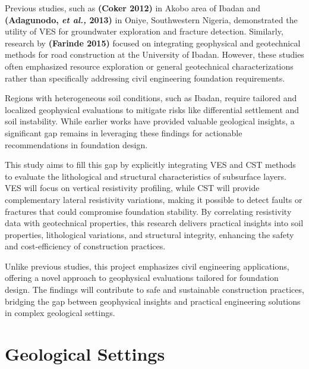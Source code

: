 \documentclass[12pt,a4paper]{report}
\begin{document}
Previous studies, such as \textbf{(Coker 2012)} in Akobo area of Ibadan and \textbf{(Adagunodo, \textit{et al.,} 2013)} in Oniye, Southwestern Nigeria, demonstrated the utility of VES for groundwater exploration and fracture detection. Similarly, research by \textbf{(Farinde 2015)} focused on integrating geophysical and geotechnical methods for road construction at the University of Ibadan. However, these studies often emphasized resource exploration or general geotechnical characterizations rather than specifically addressing civil engineering foundation requirements.

Regions with heterogeneous soil conditions, such as Ibadan, require tailored and localized geophysical evaluations to mitigate risks like differential settlement and soil instability. While earlier works have provided valuable geological insights, a significant gap remains in leveraging these findings for actionable recommendations in foundation design.

This study aims to fill this gap by explicitly integrating VES and CST methods to evaluate the lithological and structural characteristics of subsurface layers. VES will focus on vertical resistivity profiling, while CST will provide complementary lateral resistivity variations, making it possible to detect faults or fractures that could compromise foundation stability. By correlating resistivity data with geotechnical properties, this research delivers practical insights into soil properties, lithological variations, and structural integrity, enhancing the safety and cost-efficiency of construction practices.

Unlike previous studies, this project emphasizes civil engineering applications, offering a novel approach to geophysical evaluations tailored for foundation design. The findings will contribute to safe and sustainable construction practices, bridging the gap between geophysical insights and practical engineering solutions in complex geological settings.

\section{Geological Settings}
\end{document}
